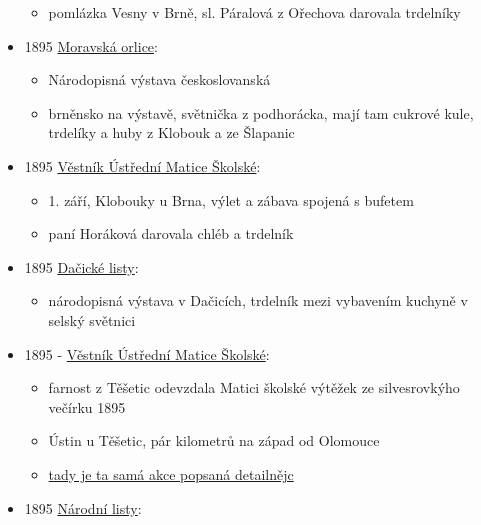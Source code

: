 \begin{itemize}
  \begin{itemize}
  \tightlist
  \item
    pomlázka Vesny v Brně, sl. Páralová z Ořechova darovala trdelníky
  \end{itemize}
\item
  1895
  \href{https://ceskadigitalniknihovna.cz/view/uuid:051a1a8d-32f0-11de-992b-00145e5790ea?page=uuid:2a7c1c1f-32f0-11de-992b-00145e5790ea&fulltext=trdeln\%C3\%AD*&source=mzk}{Moravská
  orlice}:

  \begin{itemize}
  \tightlist
  \item
    Národopisná výstava českoslovanská
  \item
    brněnsko na výstavě, světnička z podhorácka, mají tam cukrové kule,
    trdelíky a huby z Klobouk a ze Šlapanic
  \end{itemize}
\item
  1895
  \href{https://ceskadigitalniknihovna.cz/uuid/uuid:f6731d10-a2e1-11e7-a093-005056825209}{Věstník
  Ústřední Matice Školské}:

  \begin{itemize}
  \tightlist
  \item
    1. září, Klobouky u Brna, výlet a zábava spojená s bufetem
  \item
    paní Horáková darovala chléb a trdelník
  \end{itemize}
\item
  1895
  \href{https://www.digitalniknihovna.cz/vkol/uuid/uuid:a7f4aea1-a2cd-4d9f-a1fa-b43aa3c25dff}{Dačické
  listy}:

  \begin{itemize}
  \tightlist
  \item
    národopisná výstava v Dačicích, trdelník mezi vybavením kuchyně v
    selský světnici
  \end{itemize}
\item
  1895 -
  \href{https://ndk.cz/view/uuid:77d41380-a2e4-11e7-a093-005056825209?page=uuid\%3A9cb54070-a343-11e7-a093-005056825209&fulltext=trdeln\%C3\%ADk}{Věstník
  Ústřední Matice Školské}:

  \begin{itemize}
  \tightlist
  \item
    farnost z Těšetic odevzdala Matici školské výtěžek ze silvesrovkýho
    večírku 1895
  \item
    Ústin u Těšetic, pár kilometrů na západ od Olomouce
  \item
    \href{https://ndk.cz/view/uuid:eb8e3d99-435d-11dd-b505-00145e5790ea?page=uuid\%3A04295899-610e-49f5-b5b3-35f73d41b05d&fulltext=trdeln\%C3\%ADk}{tady
    je ta samá akce popsaná detailnějc}
  \end{itemize}
\item
  1895
  \href{https://ceskadigitalniknihovna.cz/uuid/uuid:6ef09ed4-435f-11dd-b505-00145e5790ea}{Národní
  listy}:


\end{itemize}
